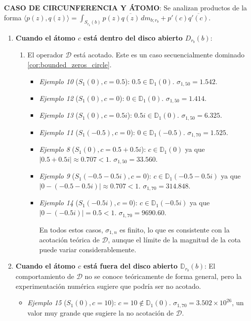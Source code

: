 \noindent \textbf{CASO DE CIRCUNFERENCIA Y ÁTOMO}: Se analizan productos de la forma $\langle p(z),q(z) \rangle=\int_{S_{r_b}(b)} p(z)\overline{q(z)}\, dm_{b;r_b} + p'(c)\overline{q'(c)}$.
\begin{enumerate}
  \item \textbf{Cuando el átomo $c$ está dentro del disco abierto $D_{r_b}(b)$}:
        \begin{enumerate}
          \item El operador $\mathcal{D}$ está acotado. Este es un caso secuencialmente dominado \ref{cor:bounded_zeros_circle}.
                \begin{itemize}
                  \item \textit{Ejemplo 10} ($S_1(0), c=0.5$): $0.5 \in \mathbb{D}_1(0)$. $\sigma_{1,50} = 1.542$.
                  \item \textit{Ejemplo 12} ($S_1(0), c=0$): $0 \in \mathbb{D}_1(0)$. $\sigma_{1,50} = 1.414$.
                  \item \textit{Ejemplo 13} ($S_1(0), c=0.5i$): $0.5i \in \mathbb{D}_1(0)$. $\sigma_{1,50} = 6.325$.
                  \item \textit{Ejemplo 11} ($S_1(-0.5), c=0$): $0 \in \mathbb{D}_1(-0.5)$. $\sigma_{1,70} = 1.525$.
                  \item \textit{Ejemplo 8} ($S_1(0), c=0.5+0.5i$): $c \in \mathbb{D}_1(0)$ ya que $|0.5+0.5i| \approx 0.707 < 1$. $\sigma_{1,50} = 33.560$.
                  \item \textit{Ejemplo 9} ($S_1(-0.5-0.5i), c=0$): $c \in \mathbb{D}_1(-0.5-0.5i)$ ya que $|0-(-0.5-0.5i)| \approx 0.707 < 1$. $\sigma_{1,70} = 314.848$.
                  \item \textit{Ejemplo 14} ($S_1(-0.5i), c=0$): $c \in \mathbb{D}_1(-0.5i)$ ya que $|0-(-0.5i)| = 0.5 < 1$. $\sigma_{1,70} = 9690.60$.

                        En todos estos casos, $\sigma_{1,n}$ es finito, lo que es consistente con la acotación teórica de $\mathcal{D}$, aunque el límite de la magnitud de la cota puede variar considerablemente.
                \end{itemize}
        \end{enumerate}
  \item \textbf{Cuando el átomo $c$ está fuera del disco abierto $\mathbb{D}_{r_b}(b)$}: El comportamiento de $\mathcal{D}$ no se conoce teóricamente de forma general, pero la experimentación numérica sugiere que podría ser no acotado.
        \begin{itemize}
          \item \textit{Ejemplo 15} ($S_1(0), c=10$): $c=10 \notin \mathbb{D}_1(0)$. $\sigma_{1,70} = 3.502 \times 10^{26}$, un valor muy grande que sugiere la no acotación de $\mathcal{D}$.
        \end{itemize}
\end{enumerate}

